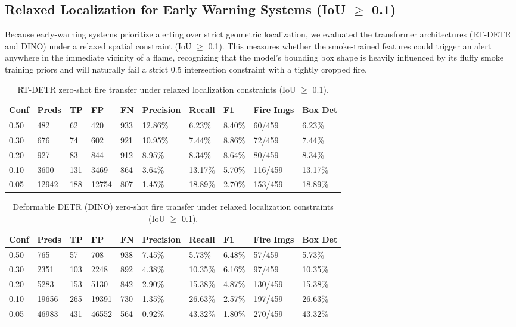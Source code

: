 \documentclass[10pt,twocolumn]{article}
\begin{document}
\subsection{Relaxed Localization for Early Warning Systems (IoU $\ge$ 0.1)}

Because early-warning systems prioritize alerting over strict geometric localization, we evaluated the transformer architectures (RT-DETR and DINO) under a relaxed spatial constraint (IoU $\ge$ 0.1). This measures whether the smoke-trained features could trigger an alert anywhere in the immediate vicinity of a flame, recognizing that the model's bounding box shape is heavily influenced by its fluffy smoke training priors and will naturally fail a strict 0.5 intersection constraint with a tightly cropped fire.

\begin{table}[H]
\centering
\caption{RT-DETR zero-shot fire transfer under relaxed localization constraints (IoU $\ge$ 0.1).}
\label{tab:rtdetr_zeroshot}
\begin{tabularx}{\columnwidth}{lXXXXXXXXX}
\toprule
Conf & Preds & TP & FP & FN & Precision & Recall & F1 & Fire Imgs & Box Det \\
\midrule
0.50 & 482 & 62 & 420 & 933 & 12.86\% & 6.23\% & 8.40\% & 60/459 & 6.23\% \\
0.30 & 676 & 74 & 602 & 921 & 10.95\% & 7.44\% & 8.86\% & 72/459 & 7.44\% \\
0.20 & 927 & 83 & 844 & 912 & 8.95\% & 8.34\% & 8.64\% & 80/459 & 8.34\% \\
0.10 & 3600 & 131 & 3469 & 864 & 3.64\% & 13.17\% & 5.70\% & 116/459 & 13.17\% \\
0.05 & 12942 & 188 & 12754 & 807 & 1.45\% & 18.89\% & 2.70\% & 153/459 & 18.89\% \\
\bottomrule
\end{tabularx}
\end{table}

\begin{table}[H]
\centering
\caption{Deformable DETR (DINO) zero-shot fire transfer under relaxed localization constraints (IoU $\ge$ 0.1).}
\label{tab:dino_zeroshot}
\begin{tabularx}{\columnwidth}{lXXXXXXXXX}
\toprule
Conf & Preds & TP & FP & FN & Precision & Recall & F1 & Fire Imgs & Box Det \\
\midrule
0.50 & 765 & 57 & 708 & 938 & 7.45\% & 5.73\% & 6.48\% & 57/459 & 5.73\% \\
0.30 & 2351 & 103 & 2248 & 892 & 4.38\% & 10.35\% & 6.16\% & 97/459 & 10.35\% \\
0.20 & 5283 & 153 & 5130 & 842 & 2.90\% & 15.38\% & 4.87\% & 130/459 & 15.38\% \\
0.10 & 19656 & 265 & 19391 & 730 & 1.35\% & 26.63\% & 2.57\% & 197/459 & 26.63\% \\
0.05 & 46983 & 431 & 46552 & 564 & 0.92\% & 43.32\% & 1.80\% & 270/459 & 43.32\% \\
\bottomrule
\end{tabularx}
\end{table}
\end{document}
